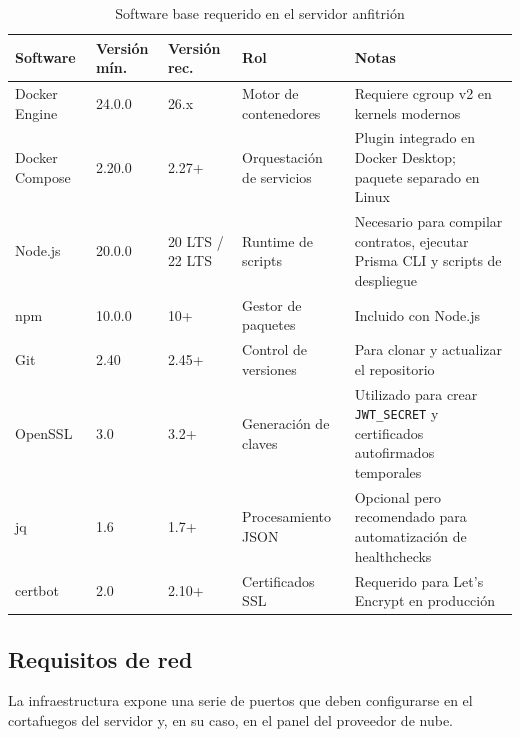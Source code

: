 \documentclass[11pt, a4paper]{article}
\begin{document}
\begin{table}[H]
\centering
\small
\renewcommand{\arraystretch}{1.4}
\begin{tabular}{@{}llllp{4cm}@{}}
\toprule
\textbf{Software} & \textbf{Versi\'{o}n m\'{i}n.} & \textbf{Versi\'{o}n rec.} & \textbf{Rol} & \textbf{Notas} \\
\midrule
Docker Engine & 24.0.0 & 26.x & Motor de contenedores & Requiere cgroup v2 en kernels modernos \\
Docker Compose & 2.20.0 & 2.27+ & Orquestaci\'{o}n de servicios & Plugin integrado en Docker Desktop; paquete separado en Linux \\
Node.js & 20.0.0 & 20 LTS / 22 LTS & Runtime de scripts & Necesario para compilar contratos, ejecutar Prisma CLI y scripts de despliegue \\
npm & 10.0.0 & 10+ & Gestor de paquetes & Incluido con Node.js \\
Git & 2.40 & 2.45+ & Control de versiones & Para clonar y actualizar el repositorio \\
OpenSSL & 3.0 & 3.2+ & Generaci\'{o}n de claves & Utilizado para crear \texttt{JWT\_SECRET} y certificados autofirmados temporales \\
jq & 1.6 & 1.7+ & Procesamiento JSON & Opcional pero recomendado para automatizaci\'{o}n de healthchecks \\
certbot & 2.0 & 2.10+ & Certificados SSL & Requerido para Let's Encrypt en producci\'{o}n \\
\bottomrule
\end{tabular}
\caption{Software base requerido en el servidor anfitri\'{o}n}
\label{tab:req-software}
\end{table}

\subsection{Requisitos de red}

La infraestructura expone una serie de puertos que deben configurarse en el cortafuegos del servidor y, en su caso, en el panel del proveedor de nube.
\end{document}
